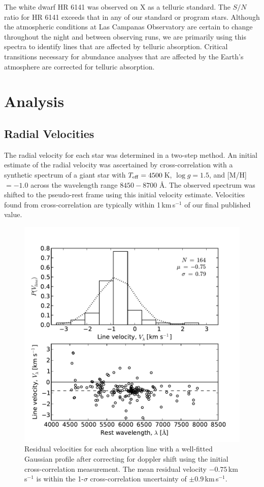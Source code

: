 \documentclass{emulateapj}
\begin{document}
The white dwarf HR 6141 was observed on X as a telluric standard. The $S/N$ ratio for HR 6141 exceeds that in any of our standard or program stars. Although the atmospheric conditions at Las Campanas Observatory are certain to change throughout the night and between observing runs, we are primarily using this spectra to identify lines that are affected by telluric absorption. Critical transitions necessary for abundance analyses that are affected by the Earth's atmosphere are corrected for telluric absorption. 

\section{Analysis}
\label{sec:analysis}

\subsection{Radial Velocities}
\label{sec:radial-velocities}

The radial velocity for each star was determined in a two-step method. An initial estimate of the radial velocity was ascertained by cross-correlation with a synthetic spectrum of a giant star with $T_{\rm eff} = 4500$\,K, $\log{g} = 1.5$, and [M/H] $= -1.0$ across the wavelength range $8450 - 8700$ \AA{}. The observed spectrum was shifted to the pseudo-rest frame using this initial velocity estimate. Velocities found from cross-correlation are typically within 1\,km\,s$^{-1}$ of our final published value.

\begin{figure}[h!]
	\includegraphics[width=\columnwidth]{./figures/line-velocity.pdf}
	\caption{Residual velocities for each absorption line with a well-fitted Gaussian profile after correcting for doppler shift using the initial cross-correlation measurement. The mean residual velocity $-0.75$\,km\,s$^{-1}$ is within the 1-$\sigma$ cross-correlation uncertainty of $\pm0.9$\,km\,s$^{-1}$.}
	\label{fig:line-velocities}
\end{figure}
\end{document}
